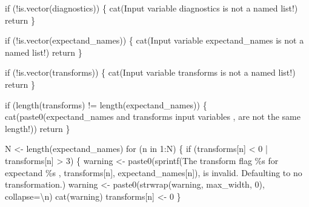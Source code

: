 \documentclass[
  letterpaper,
  DIV=11,
  numbers=noendperiod]{scrartcl}
\newenvironment{Shaded}{\begin{snugshade}}{\end{snugshade}}
\newcommand{\AttributeTok}[1]{\textcolor[rgb]{0.40,0.45,0.13}{#1}}
\newcommand{\ControlFlowTok}[1]{\textcolor[rgb]{0.00,0.23,0.31}{#1}}
\newcommand{\DecValTok}[1]{\textcolor[rgb]{0.68,0.00,0.00}{#1}}
\newcommand{\FunctionTok}[1]{\textcolor[rgb]{0.28,0.35,0.67}{#1}}
\newcommand{\NormalTok}[1]{\textcolor[rgb]{0.00,0.23,0.31}{#1}}
\newcommand{\OtherTok}[1]{\textcolor[rgb]{0.00,0.23,0.31}{#1}}
\newcommand{\SpecialCharTok}[1]{\textcolor[rgb]{0.37,0.37,0.37}{#1}}
\newcommand{\StringTok}[1]{\textcolor[rgb]{0.13,0.47,0.30}{#1}}
\begin{document}
\begin{Shaded}
\begin{Highlighting}[]
  \ControlFlowTok{if}\NormalTok{ (}\SpecialCharTok{!}\FunctionTok{is.vector}\NormalTok{(diagnostics)) \{}
    \FunctionTok{cat}\NormalTok{(}\StringTok{\textquotesingle{}Input variable \textasciigrave{}diagnostics\textasciigrave{} is not a named list!\textquotesingle{}}\NormalTok{)}
\NormalTok{    return}
\NormalTok{  \}}
  
  \ControlFlowTok{if}\NormalTok{ (}\SpecialCharTok{!}\FunctionTok{is.vector}\NormalTok{(expectand\_names)) \{}
    \FunctionTok{cat}\NormalTok{(}\StringTok{\textquotesingle{}Input variable \textasciigrave{}expectand\_names\textasciigrave{} is not a named list!\textquotesingle{}}\NormalTok{)}
\NormalTok{    return}
\NormalTok{  \}}
  
  \ControlFlowTok{if}\NormalTok{ (}\SpecialCharTok{!}\FunctionTok{is.vector}\NormalTok{(transforms)) \{}
    \FunctionTok{cat}\NormalTok{(}\StringTok{\textquotesingle{}Input variable \textasciigrave{}transforms\textasciigrave{} is not a named list!\textquotesingle{}}\NormalTok{)}
\NormalTok{    return}
\NormalTok{  \}}
  
  \ControlFlowTok{if}\NormalTok{ (}\FunctionTok{length}\NormalTok{(transforms) }\SpecialCharTok{!=} \FunctionTok{length}\NormalTok{(expectand\_names)) \{}
    \FunctionTok{cat}\NormalTok{(}\FunctionTok{paste0}\NormalTok{(}\StringTok{\textquotesingle{}\textasciigrave{}expectand\_names\textasciigrave{} and \textasciigrave{}transforms\textasciigrave{} input variables \textquotesingle{}}\NormalTok{, }
               \StringTok{\textquotesingle{}are not the same length!\textquotesingle{}}\NormalTok{))}
\NormalTok{    return}
\NormalTok{  \}}
  
\NormalTok{  N }\OtherTok{\textless{}{-}} \FunctionTok{length}\NormalTok{(expectand\_names)}
  \ControlFlowTok{for}\NormalTok{ (n }\ControlFlowTok{in} \DecValTok{1}\SpecialCharTok{:}\NormalTok{N) \{}
    \ControlFlowTok{if}\NormalTok{ (transforms[n] }\SpecialCharTok{\textless{}} \DecValTok{0} \SpecialCharTok{|}\NormalTok{ transforms[n] }\SpecialCharTok{\textgreater{}} \DecValTok{3}\NormalTok{) \{}
\NormalTok{      warning }\OtherTok{\textless{}{-}} 
        \FunctionTok{paste0}\NormalTok{(}\FunctionTok{sprintf}\NormalTok{(}\StringTok{\textquotesingle{}The transform flag \%s for expectand \%s \textquotesingle{}}\NormalTok{, }
\NormalTok{                       transforms[n], expectand\_names[n]),}
               \StringTok{\textquotesingle{}is invalid.  Defaulting to no transformation.\textquotesingle{}}\NormalTok{)}
\NormalTok{      warning }\OtherTok{\textless{}{-}} \FunctionTok{paste0}\NormalTok{(}\FunctionTok{strwrap}\NormalTok{(warning, max\_width, }\DecValTok{0}\NormalTok{), }\AttributeTok{collapse=}\StringTok{\textquotesingle{}}\SpecialCharTok{\textbackslash{}n}\StringTok{\textquotesingle{}}\NormalTok{)}
      \FunctionTok{cat}\NormalTok{(warning)}
\NormalTok{      transforms[n] }\OtherTok{\textless{}{-}} \DecValTok{0}
\NormalTok{    \}}
    

\end{Highlighting}
\end{Shaded}
\end{document}

